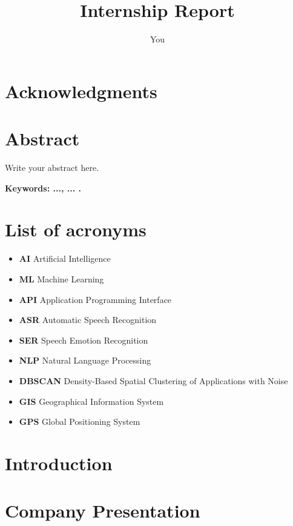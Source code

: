 \documentclass[12pt,a4paper,oneside,english]{book}
\author{You}
\title{Internship Report}
\begin{document}

\chapter*{Acknowledgments}

\frontmatter %
\chapter*{Abstract}
\normalsize{Write your abstract here.

\medskip
{\noindent \textbf{Keywords: ..., ... .} }

\tableofcontents{}
\newpage 
\listoffigures
\newpage 
\listoftables
\newpage
{}
\chapter*{List of acronyms}
\begin{itemize}
\item \textbf{AI} Artificial Intelligence
\item \textbf{ML} Machine Learning
\item \textbf{API} Application Programming Interface
\item \textbf{ASR} Automatic Speech Recognition
\item \textbf{SER} Speech Emotion Recognition
\item  \textbf{NLP} Natural Language Processing
\item \textbf{DBSCAN} Density-Based Spatial Clustering of Applications with Noise
\item \textbf{GIS} Geographical Information System
\item \textbf{GPS} Global Positioning System

\end{itemize}

\frontmatter %

\chapter*{Introduction}

\chapter{Company Presentation} %

}
\end{document}
